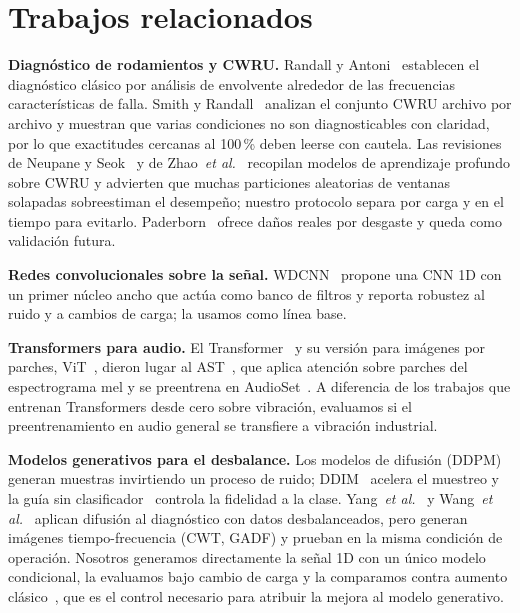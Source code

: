 \documentclass[conference]{IEEEtran}
\begin{document}
\section{Trabajos relacionados}
\textbf{Diagnóstico de rodamientos y CWRU.} Randall y Antoni~\cite{randall2011tutorial} establecen el diagnóstico clásico por análisis de envolvente alrededor de las frecuencias características de falla. Smith y Randall~\cite{smith2015cwru} analizan el conjunto CWRU archivo por archivo y muestran que varias condiciones no son diagnosticables con claridad, por lo que exactitudes cercanas al 100\,\% deben leerse con cautela. Las revisiones de Neupane y Seok~\cite{neupane2020review} y de Zhao~\textit{et al.}~\cite{zhao2020benchmark} recopilan modelos de aprendizaje profundo sobre CWRU y advierten que muchas particiones aleatorias de ventanas solapadas sobreestiman el desempeño; nuestro protocolo separa por carga y en el tiempo para evitarlo. Paderborn~\cite{lessmeier2016kat} ofrece daños reales por desgaste y queda como validación futura.

\textbf{Redes convolucionales sobre la señal.} WDCNN~\cite{zhang2017wdcnn} propone una CNN 1D con un primer núcleo ancho que actúa como banco de filtros y reporta robustez al ruido y a cambios de carga; la usamos como línea base.

\textbf{Transformers para audio.} El Transformer~\cite{vaswani2017attention} y su versión para imágenes por parches, ViT~\cite{dosovitskiy2021vit}, dieron lugar al AST~\cite{gong2021ast}, que aplica atención sobre parches del espectrograma mel y se preentrena en AudioSet~\cite{gemmeke2017audioset}. A diferencia de los trabajos que entrenan Transformers desde cero sobre vibración, evaluamos si el preentrenamiento en audio general se transfiere a vibración industrial.

\textbf{Modelos generativos para el desbalance.} Los modelos de difusión (DDPM)~\cite{ho2020ddpm} generan muestras invirtiendo un proceso de ruido; DDIM~\cite{song2021ddim} acelera el muestreo y la guía sin clasificador~\cite{ho2022cfg} controla la fidelidad a la clase. Yang~\textit{et al.}~\cite{yang2024ddpmfault} y Wang~\textit{et al.}~\cite{wang2024ddimtransnet} aplican difusión al diagnóstico con datos desbalanceados, pero generan imágenes tiempo-frecuencia (CWT, GADF) y prueban en la misma condición de operación. Nosotros generamos directamente la señal 1D con un único modelo condicional, la evaluamos bajo cambio de carga y la comparamos contra aumento clásico~\cite{park2019specaugment}, que es el control necesario para atribuir la mejora al modelo generativo.
\end{document}
